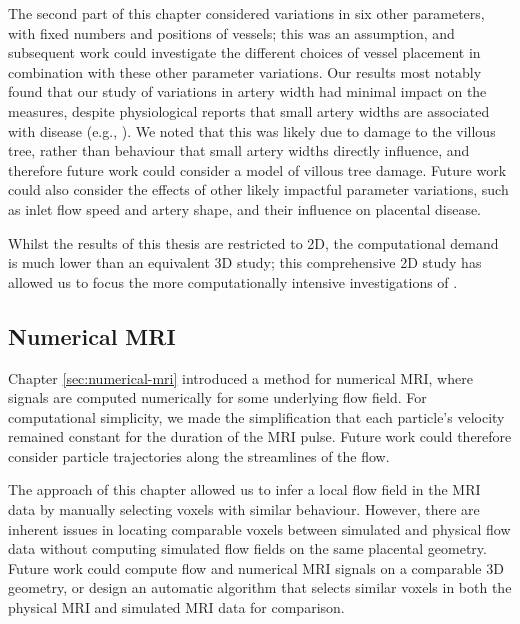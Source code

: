             The second part of this chapter considered variations in six other parameters, with fixed numbers and positions of vessels; this was an assumption, and subsequent work could investigate the different choices of vessel placement in combination with these other parameter variations. Our results most notably found that our study of variations in artery width had minimal impact on the measures, despite physiological reports that small artery widths are associated with disease (e.g., \cite{burtonRheologicalPhysiologicalConsequences2009}). We noted that this was likely due to damage to the villous tree, rather than behaviour that small artery widths directly influence, and therefore future work could consider a model of villous tree damage. Future work could also consider the effects of other likely impactful parameter variations, such as inlet flow speed and artery shape, and their influence on placental disease.

            Whilst the results of this thesis are restricted to 2D, the computational demand is much lower than an equivalent 3D study; this comprehensive 2D study has allowed us to focus the more computationally intensive investigations of \citeauthor{crowsonInvestigatingPlacentalHemodynamics2024} \cite{crowsonInvestigatingPlacentalHemodynamics2024}.

        \subsection{Numerical MRI}
            Chapter \ref{sec:numerical-mri} introduced a method for numerical MRI, where signals are computed numerically for some underlying flow field. For computational simplicity, we made the simplification that each particle's velocity remained constant for the duration of the MRI pulse. Future work could therefore consider particle trajectories along the streamlines of the flow.

            The approach of this chapter allowed us to infer a local flow field in the MRI data by manually selecting voxels with similar behaviour. However, there are inherent issues in locating comparable voxels between simulated and physical flow data without computing simulated flow fields on the same placental geometry. Future work could compute flow and numerical MRI signals on a comparable 3D geometry, or design an automatic algorithm that selects similar voxels in both the physical MRI and simulated MRI data for comparison.

